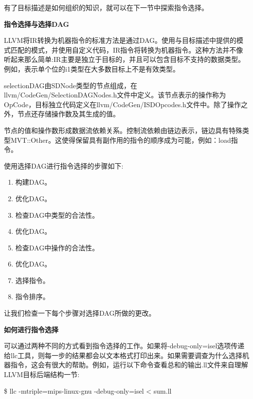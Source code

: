 有了目标描述是如何组织的知识，就可以在下一节中探索指令选择。\par

\hspace*{\fill} \par %
\textbf{指令选择与选择DAG}

LLVM将IR转换为机器指令的标准方法是通过DAG。使用与目标描述中提供的模式匹配的模式，并使用自定义代码，IR指令将转换为机器指令。这种方法并不像听起来那么简单:IR主要是独立于目标的，并且可以包含目标不支持的数据类型。例如，表示单个位的i1类型在大多数目标上不是有效类型。\par

selectionDAG由SDNode类型的节点组成，在llvm/CodeGen/SelectionDAGNodes.h文件中定义。该节点表示的操作称为OpCode，目标独立代码定义在llvm/CodeGen/ISDOpcodes.h文件中。除了操作之外，节点还存储操作数及其生成的值。\par

节点的值和操作数形成数据流依赖关系。控制流依赖由链边表示，链边具有特殊类型MVT::Other。这使得保留具有副作用的指令的顺序成为可能，例如：load指令。\par

使用选择DAG进行指令选择的步骤如下:\par

\begin{enumerate}
\item 构建DAG。
\item 优化DAG。
\item 检查DAG中类型的合法性。
\item 优化DAG。
\item 检查DAG中操作的合法性。
\item 优化DAG。
\item 选择指令。
\item 指令排序。
\end{enumerate}

让我们检查一下每个步骤对选择DAG所做的更改。\par

\hspace*{\fill} \par %
\textbf{如何进行指令选择}

可以通过两种不同的方式看到指令选择的工作。如果将-debug-only=isel选项传递给llc工具，则每一步的结果都会以文本格式打印出来。如果需要调查为什么选择机器指令，这会有很大的帮助。例如，运行以下命令查看总和的输出.ll文件来自理解LLVM目标后端结构一节:\par

\begin{tcolorbox}[colback=white,colframe=black]
\$ llc -mtriple=mips-linux-gnu -debug-only=isel < sum.ll
\end{tcolorbox}

